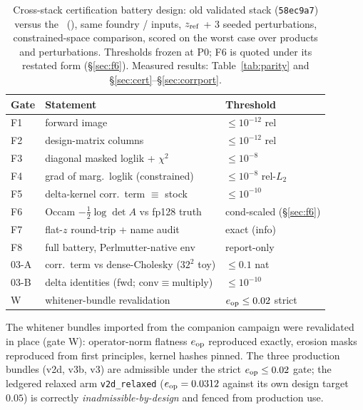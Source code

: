 \begin{table}[htbp]
\centering\footnotesize
\setlength{\tabcolsep}{4pt}
\caption{Cross-stack certification battery design: old validated stack
(\texttt{58ec9a7}) versus the \sceneapi\ (\vendorpin), same foundry
/ inputs, $z_{\rm ref}$ + 3 seeded perturbations,
constrained-space comparison, scored on the worst case over products and
perturbations. Thresholds frozen at P0; F6 is quoted under its restated
form (\S\ref{sec:f6}). Measured results: Table~\ref{tab:parity} and
\S\ref{sec:cert}--\S\ref{sec:corrport}.}
\label{tab:gates-a}
\begin{tabular}{@{}lll@{}}
\toprule
Gate & Statement & Threshold \\
\midrule
F1 & forward image & $\le10^{-12}$ rel \\
F2 & design-matrix columns & $\le10^{-12}$ rel \\
F3 & diagonal masked loglik + $\chi^2$ & $\le10^{-8}$ \\
F4 & grad of marg.\ loglik (constrained) & $\le10^{-8}$ rel-$L_2$ \\
F5 & delta-kernel corr.\ term $\equiv$ stock & $\le10^{-10}$ \\
F6 & Occam $-\tfrac12\log\det A$ vs fp128 truth & cond-scaled (\S\ref{sec:f6}) \\
F7 & flat-$z$ round-trip + name audit & exact (info) \\
F8 & full battery, Perlmutter-native env & report-only \\
03-A & corr.\ term vs dense-Cholesky ($32^2$ toy) & $\le0.1$ nat \\
03-B & delta identities (fwd; conv$\equiv$multiply) & $\le10^{-10}$ \\
W & whitener-bundle revalidation & $e_{\mathrm{op}}\le0.02$ strict \\
\bottomrule
\end{tabular}
\end{table}

The whitener bundles imported from the companion campaign were revalidated
in place (gate W): operator-norm flatness $e_{\mathrm{op}}$ reproduced exactly,
erosion masks reproduced from first principles, kernel hashes pinned. The
three production bundles (v2d, v3b, v3) are admissible under the strict
$e_{\mathrm{op}}\le0.02$ gate; the ledgered relaxed arm \texttt{v2d\_relaxed}
($e_{\mathrm{op}}=0.0312$ against its own design target $0.05$) is correctly
\emph{inadmissible-by-design} and fenced from production
use.

